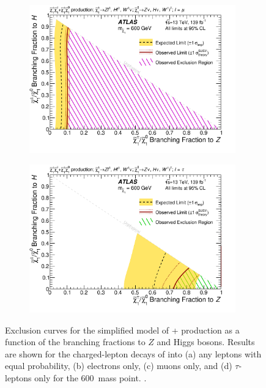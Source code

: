 \begin{figure}[ht]
\begin{subfigure}[b]{0.49\textwidth}
      \includegraphics[width=0.98\textwidth]{figs/rpvthreel/triangleLimits_bre_0_brm_100_brt_0_mass_600.png}
      \caption{}
      \label{fig:triangle_100mu}
    \end{subfigure}
    \begin{subfigure}[b]{0.49\textwidth}
      \centering
      \includegraphics[width=0.98\textwidth]{figs/rpvthreel/triangleLimits_bre_0_brm_0_brt_100_mass_600.png}
      \caption{}
      \label{fig:triangle_100tau}
    \end{subfigure}
    \caption[Exclusion curves for the simplified model of \CCsignal + \CNsignal production as a function of the branching fractions to $Z$ and Higgs bosons.]{Exclusion curves for the simplified model of \CCsignal + \CNsignal production as a function of the branching fractions to $Z$ and Higgs bosons.
    Results are shown for the charged-lepton decays of \chono into (a) any leptons with equal probability, (b) electrons only, (c) muons only, and (d) $\tau$-leptons only for the 600~\GeV mass point. 
    \explimit
    \obslimit
    \exludedcolors
    \cite{ATLAS:2020uer}.}
    \label{fig:triangles}
\end{figure}
